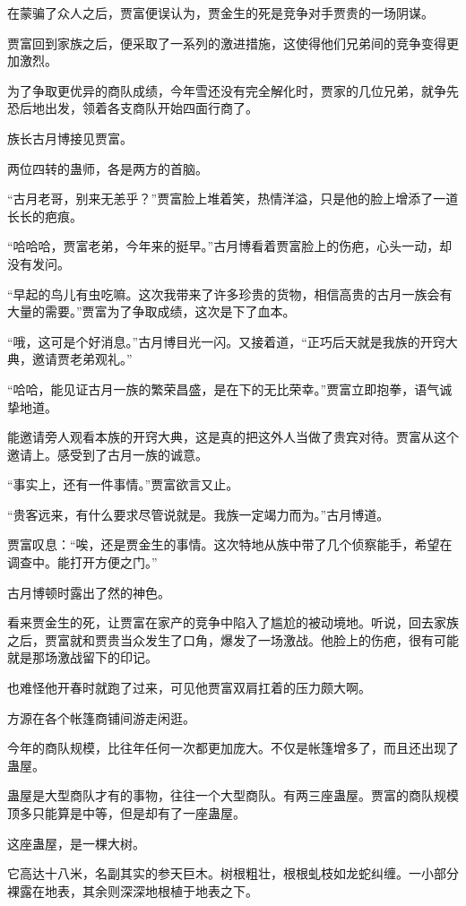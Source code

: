\begin{this_body}
在蒙骗了众人之后，贾富便误认为，贾金生的死是竞争对手贾贵的一场阴谋。

贾富回到家族之后，便采取了一系列的激进措施，这使得他们兄弟间的竞争变得更加激烈。

为了争取更优异的商队成绩，今年雪还没有完全解化时，贾家的几位兄弟，就争先恐后地出发，领着各支商队开始四面行商了。

族长古月博接见贾富。

两位四转的蛊师，各是两方的首脑。

“古月老哥，别来无恙乎？”贾富脸上堆着笑，热情洋溢，只是他的脸上增添了一道长长的疤痕。

“哈哈哈，贾富老弟，今年来的挺早。”古月博看着贾富脸上的伤疤，心头一动，却没有发问。

“早起的鸟儿有虫吃嘛。这次我带来了许多珍贵的货物，相信高贵的古月一族会有大量的需要。”贾富为了争取成绩，这次是下了血本。

“哦，这可是个好消息。”古月博目光一闪。又接着道，“正巧后天就是我族的开窍大典，邀请贾老弟观礼。”

“哈哈，能见证古月一族的繁荣昌盛，是在下的无比荣幸。”贾富立即抱拳，语气诚挚地道。

能邀请旁人观看本族的开窍大典，这是真的把这外人当做了贵宾对待。贾富从这个邀请上。感受到了古月一族的诚意。

“事实上，还有一件事情。”贾富欲言又止。

“贵客远来，有什么要求尽管说就是。我族一定竭力而为。”古月博道。

贾富叹息：“唉，还是贾金生的事情。这次特地从族中带了几个侦察能手，希望在调查中。能打开方便之门。”

古月博顿时露出了然的神色。

看来贾金生的死，让贾富在家产的竞争中陷入了尴尬的被动境地。听说，回去家族之后，贾富就和贾贵当众发生了口角，爆发了一场激战。他脸上的伤疤，很有可能就是那场激战留下的印记。

也难怪他开春时就跑了过来，可见他贾富双肩扛着的压力颇大啊。

方源在各个帐篷商铺间游走闲逛。

今年的商队规模，比往年任何一次都更加庞大。不仅是帐篷增多了，而且还出现了蛊屋。

蛊屋是大型商队才有的事物，往往一个大型商队。有两三座蛊屋。贾富的商队规模顶多只能算是中等，但是却有了一座蛊屋。

这座蛊屋，是一棵大树。

它高达十八米，名副其实的参天巨木。树根粗壮，根根虬枝如龙蛇纠缠。一小部分裸露在地表，其余则深深地根植于地表之下。


\end{this_body}
